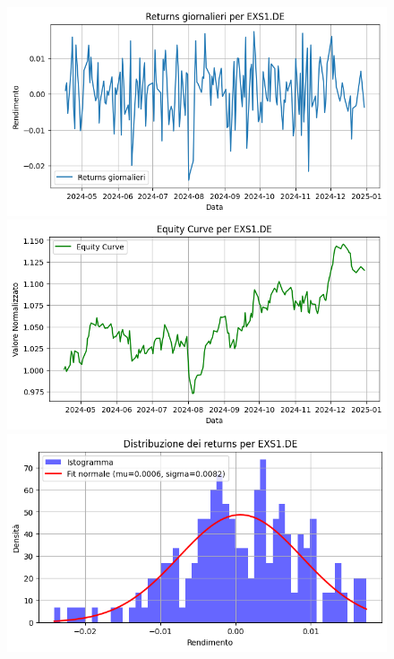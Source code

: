 \documentclass{article}%
\begin{document}
\begin{figure}[htbp]%
\begin{minipage}{0.31\textwidth}%
\includegraphics[width=\linewidth]{immagini_tickers/EXS1.DE_returns_plot.png}%
\end{minipage}%
\begin{minipage}{0.31\textwidth}%
\includegraphics[width=\linewidth]{immagini_tickers/EXS1.DE_equity_curve.png}%
\end{minipage}%
\begin{minipage}{0.31\textwidth}%
\includegraphics[width=\linewidth]{immagini_tickers/EXS1.DE_distribuzione_returns.png}%
\end{minipage}%
\end{figure}
\end{document}
